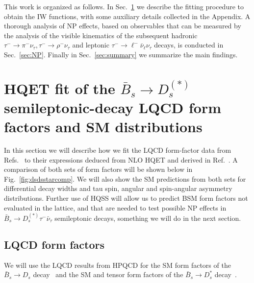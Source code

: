 \documentclass[aps,superscriptaddress,showpacs,nofootinbib,11pt]{revtex4-1}
\begin{document}
This work is organized as follows. In Sec.~\ref{sec:SMHQSS} we describe the fitting procedure to obtain the IW functions, with some auxiliary details collected in the Appendix.
  A thorough analysis of NP effects, based on observables that can be measured by the analysis of the visible kinematics of the subsequent hadronic $\tau^-\to
  \pi^-\nu_\tau, \tau^-\to \rho^-\nu_\tau$ and leptonic $\tau^-\to \ell^-\bar\nu_\ell\nu_\tau$ decays, is conducted in 
  Sec.~\ref{sec:NP}. Finally in Sec.~\ref{sec:summary} we summarize the main findings.


%
\section{HQET fit of the $\bar B_s\to D^{(*)}_s$ semileptonic-decay LQCD form factors and SM distributions}
\label{sec:SMHQSS}
In this section we will describe how we fit the LQCD form-factor data   from
 Refs.~\cite{Harrison:2023dzh,McLean:2019qcx} to their expressions deduced from 
   NLO HQET and derived in Ref.~\cite{Bernlochner:2017jka}. A comparison of both sets of form factors will be shown below in Fig.~\ref{fig:dsdsstarcomp}.  We will also show the SM predictions from both sets  for differential decay widths and tau spin, angular and spin-angular asymmetry distributions. Further use of HQSS will allow us  to predict BSM form factors not evaluated in the lattice, and that  are needed  to test  possible NP effects in $ \bar B_s\to D^{(*)}_s\tau^-\bar\nu_\tau$ semileptonic decays, something we will do in the next section.
\subsection{LQCD form factors}





We will use the LQCD results from HPQCD for the SM form factors of the $\bar B_s\to
D_s$ decay~\cite{McLean:2019qcx}  and the SM and tensor form factors of the  $\bar
B_s\to D^*_s$ decay~\cite{Harrison:2023dzh}.
\end{document}
